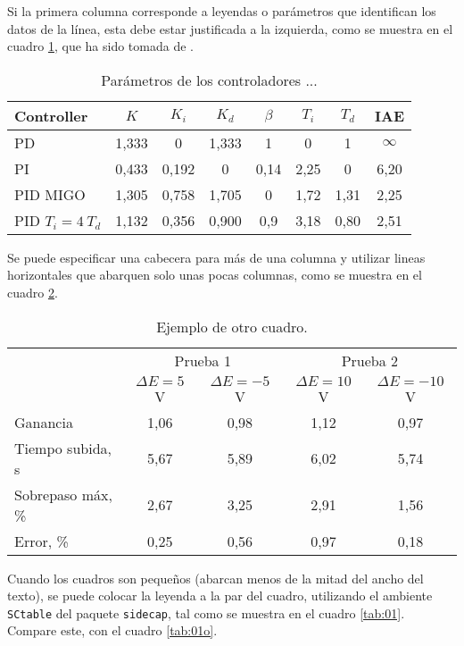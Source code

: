 Si la primera columna corresponde a leyendas o parámetros que identifican los datos de la línea, esta debe estar justificada a la izquierda, como se muestra en el cuadro \ref{tab:AH}, que ha sido tomada de \cite{astromhagglund2006}.

\begin{table}
\caption{Parámetros de los controladores ...} \label{tab:AH}
\begin{center}
    \begin{tabular}{@{}l*{7}{c}@{}}
    \toprule
    Controller & $K$ & $K_i$ & $K_d$ & $\beta$ & $T_i$ & $T_d$ & IAE \\
    \midrule
    PD &  1,333 & 0 & 1,333 & 1 & 0 &1 & $\infty$ \\
		PI & 0,433 & 0,192 & 0 & 0,14 & 2,25 & 0 & 6,20 \\
		PID MIGO & 1,305 & 0,758 & 1,705 & 0 & 1,72 & 1,31 & 2,25 \\
		PID $T_i=4 \ T_d$ & 1,132 & 0,356 & 0,900 & 0,9 & 3,18 & 0,80 & 2,51 \\
    \bottomrule
    \end{tabular}
\end{center}
\end{table}

Se puede especificar una cabecera para más de una columna y utilizar lineas horizontales que abarquen solo unas pocas columnas, como se muestra en el cuadro \ref{tab:muestra}.

\begin{table}
\caption{Ejemplo de otro cuadro.} \label{tab:muestra}
	\begin{tabular}{@{}l*{4}{c}@{}}
	\toprule
	& \multicolumn{2}{c}{Prueba 1} & \multicolumn{2}{c}{Prueba 2} \\
	\cmidrule(l{2pt}r{2pt}){2-3}\cmidrule(l{2pt}r{2pt}){4-5} 
	& $\Delta E=5$ V & $\Delta E = -5$ V & $\Delta E = 10$ V & $\Delta E = -10$ V \\
	\midrule
	Ganancia             &  1,06 & 0,98 & 1,12 & 0,97 \\
	Tiempo subida, s  &  5,67 & 5,89 & 6,02 & 5,74 \\
	Sobrepaso máx, \%        &  2,67 & 3,25 & 2,91 & 1,56 \\
	Error, \% &  0,25 & 0,56 & 0,97 & 0,18 \\
	\bottomrule
	\end{tabular}
\end{table}

\newpage
Cuando los cuadros son pequeños (abarcan menos de la mitad del ancho del texto), se puede colocar la leyenda a la par del cuadro, utilizando el ambiente \texttt{SCtable} del paquete \texttt{sidecap}, tal como se muestra en el cuadro \ref{tab:01}.  Compare este, con el cuadro \ref{tab:01o}.


